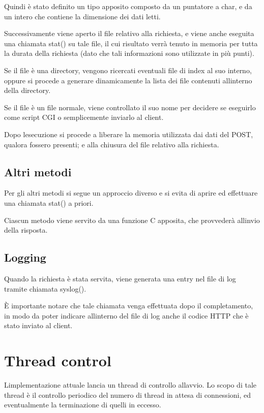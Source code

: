 \documentclass[a4paper,11pt]{article}
\begin{document}
{\sffamily
Quindi \`e stato definito un tipo apposito composto da un puntatore a
char, e da un intero che contiene la dimensione dei dati letti.}

{\sffamily
Successivamente viene aperto il file relativo alla richiesta, e viene
anche eseguita una chiamata stat() su tale file, il cui risultato
verr\`a tenuto in memoria per tutta la durata della richiesta (dato che
tali informazioni sono utilizzate in pi\`u punti).}

{\sffamily
Se il file \`e una directory, vengono ricercati eventuali file di index
al suo interno, oppure si procede a generare dinamicamente la lista dei
file contenuti all{\textquotesingle}interno della directory.}

{\sffamily
Se il file \`e un file normale, viene controllato il suo nome per
decidere se eseguirlo come script CGI o semplicemente inviarlo al
client.}

{\sffamily
Dopo l{\textquotesingle}esecuzione si procede a liberare la memoria
utilizzata dai dati del POST, qualora fossero presenti; e alla chiusura
del file relativo alla richiesta.}

\subsection{Altri metodi}
{\sffamily
Per gli altri metodi si segue un approccio diverso e si evita di aprire
ed effettuare una chiamata stat() a priori.}

{\sffamily
Ciascun metodo viene servito da una funzione C apposita, che
provveder\`a all{\textquotesingle}invio della risposta.}

\subsection{Logging}
{\sffamily
Quando la richiesta \`e stata servita, viene generata una entry nel file
di log tramite chiamata syslog().}

{\sffamily
\`E importante notare che tale chiamata venga effettuata dopo il
completamento, in modo da poter indicare all{\textquotesingle}interno
del file di log anche il codice HTTP che \`e stato inviato al client.}

\section{Thread control}
{\sffamily
L{\textquotesingle}implementazione attuale lancia un thread di controllo
all{\textquotesingle}avvio. Lo scopo di tale thread \`e il controllo
periodico del numero di thread in attesa di connessioni, ed
eventualmente la terminazione di quelli in eccesso.}
\end{document}
